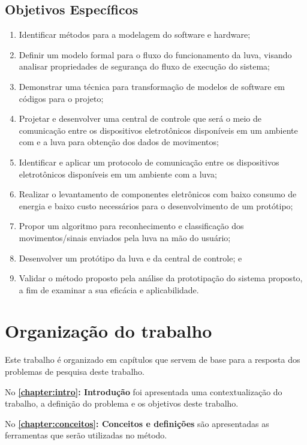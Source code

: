 \subsection{Objetivos Específicos}
\begin{enumerate}
    \item Identificar métodos para a modelagem do software e hardware;
    \item Definir um modelo formal para o fluxo do funcionamento da luva, visando analisar propriedades de segurança do fluxo de execução do sistema;
    \item Demonstrar uma técnica para transformação de modelos de software em códigos para o projeto;
    \item Projetar e desenvolver uma central de controle que será o meio de comunicação entre os dispositivos eletrotônicos disponíveis em um ambiente com e a luva para obtenção dos dados de movimentos;
    \item Identificar e aplicar um protocolo de comunicação entre os dispositivos eletrotônicos disponíveis em um ambiente com a luva;
    \item Realizar o levantamento de componentes eletrônicos com baixo consumo de energia e baixo custo necessários para o desenvolvimento de um protótipo;    
    \item Propor um algoritmo para reconhecimento e classificação dos movimentos/sinais enviados pela luva na mão do usuário;
    \item Desenvolver um protótipo da luva e da central de controle; e
    \item Validar o método proposto pela análise da prototipação do sistema proposto, a fim de examinar a sua eficácia e aplicabilidade. 
\end{enumerate}

\section{Organização do trabalho}

Este trabalho é organizado em capítulos que servem de base para a resposta dos problemas de pesquisa deste trabalho.

No \textbf{\autoref{chapter:intro}: Introdução} foi apresentada uma contextualização do trabalho, a definição do problema e os objetivos deste trabalho.

No \textbf{\autoref{chapter:conceitos}: Conceitos e definições} são apresentadas as ferramentas que serão utilizadas no método.

